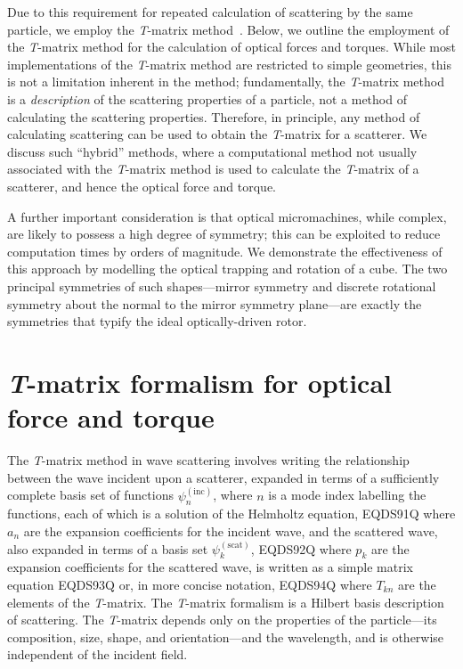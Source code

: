 \documentclass{article}
\begin{document}
Due to this requirement for repeated calculation of scattering by
the same particle, we employ the \textit{T}-matrix
method~\cite{waterman1971,mishchenko2004b}.
Below, we outline the employment of the \textit{T}-matrix method
for the calculation of optical forces and torques. While most
implementations of the \textit{T}-matrix method are
restricted to simple geometries, this is not a limitation
inherent in the method; fundamentally, the \textit{T}-matrix
method is a \emph{description} of the scattering properties of
a particle, not a method of calculating the scattering properties.
Therefore, in principle, any method of calculating scattering
can be used to obtain the \textit{T}-matrix for a scatterer.
We discuss such ``hybrid'' methods, where a computational method
not usually associated with the \textit{T}-matrix method is
used to calculate the \textit{T}-matrix of a scatterer, and hence
the optical force and torque.

A further important consideration is that optical micromachines,
while complex, are likely to possess a high degree of symmetry; this
can be exploited to reduce computation times by orders of magnitude.
We demonstrate the effectiveness of this approach by modelling
the optical trapping and rotation of a cube. The two principal
symmetries of such shapes---mirror symmetry and discrete rotational
symmetry about the normal to the mirror symmetry plane---are
exactly the symmetries that typify the ideal optically-driven rotor.


\section{\textit{T}-matrix formalism for optical force and torque}

The \textit{T}-matrix method in wave scattering involves writing the
relationship between the wave incident upon a scatterer, expanded in terms of
a sufficiently complete basis set of functions $\psi_n^{(\mathrm{inc})}$,
where $n$ is a mode index labelling the functions, each of which is a
solution of the Helmholtz equation,
EQDS91Q
where $a_n$ are the expansion coefficients for the incident wave,
and the scattered wave, also expanded in terms of a basis set
$\psi_k^{(\mathrm{scat})}$,
EQDS92Q
where $p_k$ are the expansion coefficients for the scattered wave,
is written as a simple matrix equation
EQDS93Q
or,  in more concise notation,
EQDS94Q
where $T_{kn}$ are the elements of the \textit{T}-matrix. The
\textit{T}-matrix formalism is a Hilbert basis description of
scattering. The \textit{T}-matrix depends only on the properties of the
particle---its composition,  size,
shape, and orientation---and the wavelength, and is otherwise
independent of the incident field.
\end{document}
